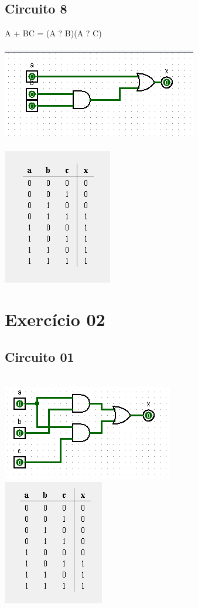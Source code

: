 \documentclass[12pt]{article}
\begin{document}
\subsection{Circuito 8}
A + BC = (A ? B)(A ? C)\\
\\\includegraphics{./images/circuito08.png}\\
\\\includegraphics{./images/circuito08_table.png}

\section{Exercício 02}
\subsection{Circuito 01}
\\\includegraphics{./images/exercicio02_circuito01.png}
\\\includegraphics{./images/exercicio02_circuito01_table.png}
\end{document}
